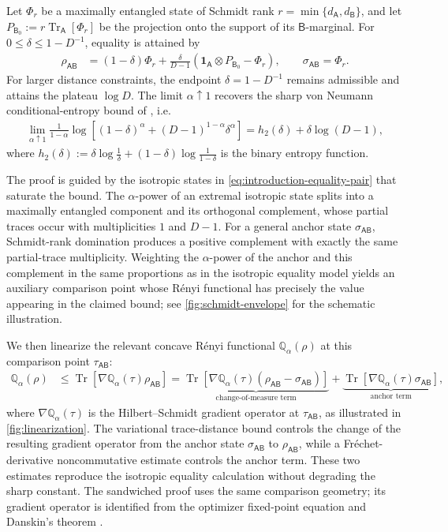 \documentclass[11pt,reqno]{amsart}
\theoremstyle{definition}
\DeclareMathOperator{\Tr}{Tr}
\newcommand{\I}{\mathbf 1}
\newcommand{\A}{\mathsf{A}}
\newcommand{\B}{\mathsf{B}}
\begin{document}
Let $\Phi_r$ be a maximally entangled state of Schmidt rank
$r=\min\{d_{\A},d_{\B}\}$, and let $
 P_{\B_0}:=r\Tr_{\A}[\Phi_r]$
be the projection onto the support of its $\B$-marginal.
For $0\leq\delta\leq1-D^{-1}$, equality is attained by
\begin{align}
 \rho_{\A\B}
 &=
 (1-\delta)\Phi_r
 +\frac{\delta}{D-1}
 \left(
 \I_{\A}\otimes P_{\B_0}-\Phi_r
 \right),
 \qquad
 \sigma_{\A\B}=\Phi_r.
 \label{eq:introduction-equality-pair}
\end{align}
For larger distance constraints, the endpoint
$\delta=1-D^{-1}$ remains admissible and attains the plateau $\log D$.
The limit
$\alpha\uparrow1$ recovers the sharp von Neumann conditional-entropy bound
of \cite{BertaEtAl2026}, i.e.~
\begin{align}
    \lim_{\alpha\uparrow1}
 \frac1{1-\alpha}
 \log\!\left[(1-\delta)^\alpha
 +(D-1)^{1-\alpha}\delta^\alpha\right]
 =h_2(\delta)+\delta\log(D-1),
\end{align}
where $h_2(\delta) := \delta \log \frac{1}{\delta} + (1-\delta) \log \frac{1}{1-\delta}$ is the binary entropy function.

The proof is guided by the isotropic states in \cref{eq:introduction-equality-pair} that saturate the bound.  The
$\alpha$-power of an extremal isotropic state splits into a maximally
entangled component and its orthogonal complement, whose partial traces
occur with multiplicities $1$ and $D-1$.  
For a general anchor state $\sigma_{\A\B}$,
Schmidt-rank domination \cite{terhal2000schmidt} produces a positive complement with exactly the
same partial-trace multiplicity.  Weighting the $\alpha$-power of the
anchor and this complement in the same proportions as in the isotropic
equality model yields an auxiliary comparison point whose R\'enyi
functional has precisely the value appearing in the claimed bound; see
\cref{fig:schmidt-envelope} for the schematic illustration.

We then linearize the relevant concave R\'enyi functional $\mathbb{Q}_\alpha(\rho)$ at this
comparison point $\tau_{\A\B}$:
\begin{align} \label{eq:concave_envelope}
\mathbb{Q}_\alpha(\rho)
 &\leq \Tr\!\left[\nabla\mathbb{Q}_\alpha(\tau)\rho_{\A\B}\right]
 =
 \underbrace{\Tr\!\left[\nabla\mathbb{Q}_\alpha(\tau)(\rho_{\A\B}-\sigma_{\A\B})\right]}_{\text{change-of-measure term}}
 +
\underbrace{\Tr\!\left[\nabla\mathbb{Q}_\alpha(\tau)\sigma_{\A\B}\right]}_{\text{anchor term}},
\end{align}
where $\nabla\mathbb{Q}_\alpha(\tau)$ is the Hilbert--Schmidt gradient operator at $\tau_{\A\B}$, as illustrated in \cref{fig:linearization}.
The variational trace-distance bound controls the change of the resulting
gradient operator from the anchor state $\sigma_{\A\B}$ to
$\rho_{\A\B}$, while a Fr\'echet-derivative noncommutative estimate controls the anchor term.
These two estimates reproduce the isotropic
equality calculation without degrading the sharp constant.
The sandwiched
proof uses the same comparison geometry; its gradient operator is
identified from the optimizer fixed-point equation \cite{HT14} and
Danskin's theorem \cite{Danskin1967}.
\end{document}

